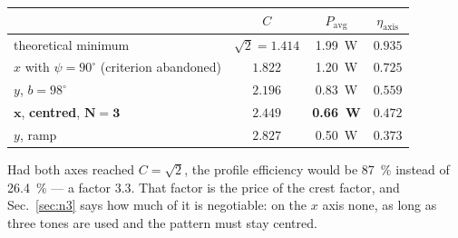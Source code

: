 \documentclass[11pt,a4paper]{article}
\newcommand{\crest}{\ensuremath{C}}
\begin{document}
\begin{center}\small
\begin{tabular}{lccc}
\toprule
& $\crest$ & $P_\mathrm{avg}$ & $\eta_\mathrm{axis}$\\
\midrule
theoretical minimum & $\sqrt2=1.414$ & \SI{1.99}{\watt} & $0.935$\\
$x$ with $\psi=90^\circ$ (criterion abandoned) & $1.822$ & \SI{1.20}{\watt} & $0.725$\\
$y$, $b=98^\circ$ & $2.196$ & \SI{0.83}{\watt} & $0.559$\\
$\mathbf x$, \textbf{centred}, $\mathbf{N=3}$ & $\mathbf{2.449}$ & \textbf{\SI{0.66}{\watt}} & $\mathbf{0.472}$\\
$y$, ramp & $2.827$ & \SI{0.50}{\watt} & $0.373$\\
\bottomrule
\end{tabular}
\end{center}

\noindent Had both axes reached $\crest=\sqrt2$, the profile efficiency would
be \SI{87}{\percent} instead of \SI{26.4}{\percent} --- a factor $3.3$. That
factor is the price of the crest factor, and Sec.~\ref{sec:n3} says how much of
it is negotiable: on the $x$ axis none, as long as three tones are used and the
pattern must stay centred.



\end{document}
